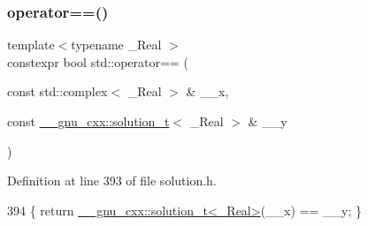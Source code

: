 \subsubsection{\texorpdfstring{operator==()}{operator==()}\hspace{0.1cm}{\footnotesize\ttfamily [5/5]}}
{\footnotesize\ttfamily template$<$typename \+\_\+\+Real $>$ \\
constexpr bool std\+::operator== (\begin{DoxyParamCaption}\item[{const std\+::complex$<$ \+\_\+\+Real $>$ \&}]{\+\_\+\+\_\+x,  }\item[{const \hyperlink{namespace____gnu__cxx_ae20ea642de50eb361074c62676b0159c}{\+\_\+\+\_\+gnu\+\_\+cxx\+::solution\+\_\+t}$<$ \+\_\+\+Real $>$ \&}]{\+\_\+\+\_\+y }\end{DoxyParamCaption})}



Definition at line 393 of file solution.\+h.


\begin{DoxyCode}
394     \{ \textcolor{keywordflow}{return} \hyperlink{namespace____gnu__cxx_ae20ea642de50eb361074c62676b0159c}{\_\_gnu\_cxx::solution\_t<\_Real>}(\_\_x) == \_\_y; \}
\end{DoxyCode}
